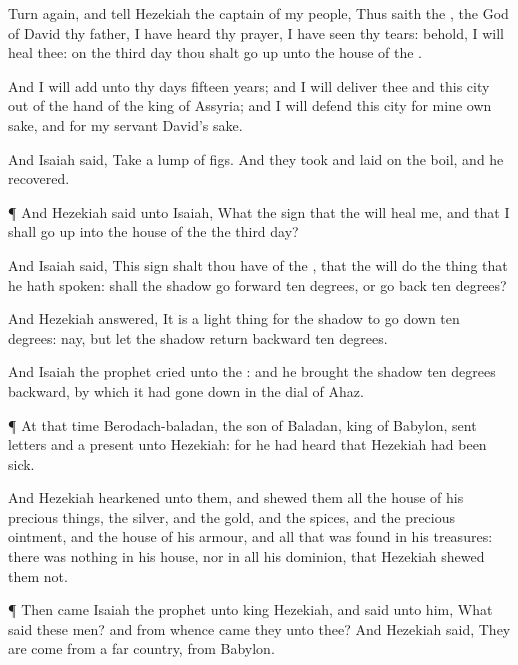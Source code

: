 {Turn
again, and
tell
Hezekiah the
captain of my
people, Thus
saith the
{}, the
God of
David thy
father, I have
heard thy
prayer, I have
seen thy
tears: behold, I will
heal thee: on the
third
day thou shalt go
up unto the
house of the
{}.

And I will
add unto thy
days
fifteen
years; and I will
deliver thee and this
city out of the
hand of the
king of
Assyria; and I will
defend this
city for mine own sake, and for my
servant
David’s sake.

And
Isaiah
said,
Take a
lump of
figs. And they
took and
laid
{} on the
boil, and he
recovered.


\par }{\PP {}¶ And
Hezekiah
said unto
Isaiah, What
{} the
sign that the
{} will
heal me, and that I shall go
up into the
house of the
{} the
third
day?

And
Isaiah
said, This
sign shalt thou have of the
{}, that the
{} will
do the
thing that he hath
spoken: shall the
shadow go
forward
ten
degrees, or go
back
ten
degrees?

And
Hezekiah
answered, It is a light
thing for the
shadow to go
down
ten
degrees: nay, but let the
shadow
return
backward
ten
degrees.

And
Isaiah the
prophet
cried unto the
{}: and he
brought the
shadow
ten
degrees
backward,
by which it had gone
down in the
dial of
Ahaz.


\par }{\PP {}¶ At that
time
Berodach-baladan, the
son of
Baladan,
king of
Babylon,
sent
letters and a
present unto
Hezekiah: for he had
heard that
Hezekiah had been
sick.

And
Hezekiah
hearkened unto them, and
shewed them all the
house of his precious
things, the
silver, and the
gold, and the
spices, and the
precious
ointment, and
{} the
house of his
armour, and all that was
found in his
treasures: there was
nothing in his
house, nor in all his
dominion, that
Hezekiah
shewed them not.


\par }{\PP {}¶ Then
came
Isaiah the
prophet unto
king
Hezekiah, and
said unto him, What
said these
men? and from
whence
came they unto thee? And
Hezekiah
said, They are
come from a
far
country,
{} from
Babylon.

}
